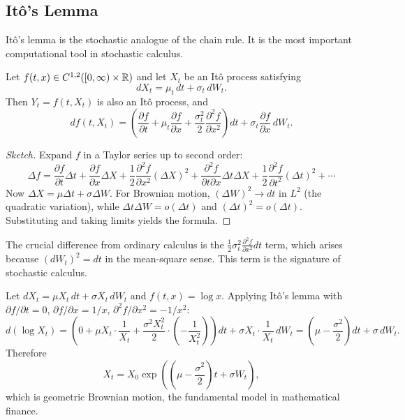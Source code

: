 \subsection{It\^{o}'s Lemma}

It\^{o}'s lemma is the stochastic analogue of the chain rule. It is the most important computational tool in stochastic calculus.

\begin{theorem}[It\^{o}'s Lemma]
Let \(f(t,x) \in C^{1,2}([0,\infty) \times \mathbb{R})\) and let \(X_t\) be an It\^{o} process satisfying
\[
dX_t = \mu_t \, dt + \sigma_t \, dW_t.
\]
Then \(Y_t = f(t, X_t)\) is also an It\^{o} process, and
\[
df(t,X_t) = \left(\frac{\partial f}{\partial t} + \mu_t \frac{\partial f}{\partial x} + \frac{\sigma_t^2}{2} \frac{\partial^2 f}{\partial x^2}\right) dt + \sigma_t \frac{\partial f}{\partial x} \, dW_t.
\]
\end{theorem}

\begin{proof}[Sketch]
Expand \(f\) in a Taylor series up to second order:
\[
\Delta f = \frac{\partial f}{\partial t} \Delta t + \frac{\partial f}{\partial x} \Delta X + \frac12 \frac{\partial^2 f}{\partial x^2} (\Delta X)^2 + \frac{\partial^2 f}{\partial t \partial x} \Delta t \Delta X + \frac12 \frac{\partial^2 f}{\partial t^2} (\Delta t)^2 + \cdots
\]
Now \(\Delta X = \mu \Delta t + \sigma \Delta W\). For Brownian motion, \((\Delta W)^2 \to dt\) in \(L^2\) (the quadratic variation), while \(\Delta t \Delta W = o(\Delta t)\) and \((\Delta t)^2 = o(\Delta t)\). Substituting and taking limits yields the formula.
\end{proof}

The crucial difference from ordinary calculus is the \( \frac12 \sigma_t^2 \frac{\partial^2 f}{\partial x^2} dt \) term, which arises because \((dW_t)^2 = dt\) in the mean-square sense. This term is the signature of stochastic calculus.

\begin{example}
Let \(dX_t = \mu X_t \, dt + \sigma X_t \, dW_t\) and \(f(t,x) = \log x\). Applying It\^{o}'s lemma with \(\partial f/\partial t = 0\), \(\partial f/\partial x = 1/x\), \(\partial^2 f/\partial x^2 = -1/x^2\):
\[
d(\log X_t) = \left(0 + \mu X_t \cdot \frac{1}{X_t} + \frac{\sigma^2 X_t^2}{2} \cdot \left(-\frac{1}{X_t^2}\right)\right) dt + \sigma X_t \cdot \frac{1}{X_t} \, dW_t
= \left(\mu - \frac{\sigma^2}{2}\right) dt + \sigma \, dW_t.
\]
Therefore
\[
X_t = X_0 \exp\left(\left(\mu - \frac{\sigma^2}{2}\right) t + \sigma W_t\right),
\]
which is geometric Brownian motion, the fundamental model in mathematical finance.
\end{example}


